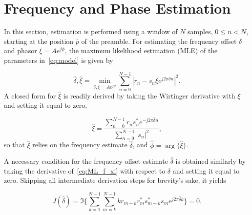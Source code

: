\section{Frequency and Phase Estimation}%
\label{sec:freq_est}   

In this section, estimation is performed using a window of $N$ samples, $0\leq n<N$, starting
at the position $\bar{p}$ of the preamble.
For estimating the frequency offset $\delta$ and phasor $\xi=Ae^{j\phi}$, the maximum likelihood estimation (MLE) of the parameters in~\eqref{eq:model} is given by

\begin{equation}
    \label{eq:ML_f_xi}
      \hat{\delta},\hat{\xi}=\min_{\delta,\xi=Ae^{j\phi}}\sum_{n=0}^{N-1}|r_n-s_n\xi e^{j2\pi\delta n}|^{2}.
    \end{equation}
A closed form for $\hat{\xi}$ is readily derived by taking the Wirtinger derivative with $\xi$ and setting it equal to zero,

\begin{equation}
    \label{eq:opt_xi}
    \hat{\xi}=\frac{\sum_{n=0}^{N-1}{r_{n}s_n^{*}e^{-j2\pi\hat{\delta} n}}}{\sum_{n=0}^{N-1}|s_{n}|^2},
  \end{equation}
so that $\hat{\xi}$ relies on the frequency estimate $\hat{\delta}$, and $\hat{\phi}=\arg\{\hat{\xi}\}$. 


A necessary condition for the frequency offset estimate $\hat{\delta}$
is obtained similarly by taking the derivative of~\eqref{eq:ML_f_xi} with respect to
$\delta$ and setting it equal to zero. Skipping all intermediate derivation steps for brevity's sake,
it yields

\begin{equation}
    \label{eq:necessary condition for delta}
    J(\hat{\delta}) = \Im\bigg\{\sum_{k=1}^{N-1}{\sum_{m=k}^{N-1}{kr_{m-k}r_m^{*}s_{m-k}^{*}s_m}e^{j2\pi\hat{\delta}k}}\bigg\}=0.
    \end{equation}

